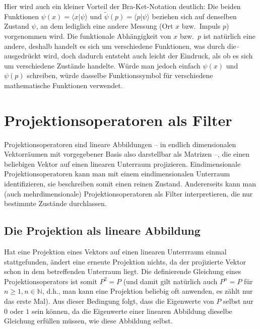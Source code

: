 Hier wird auch ein kleiner Vorteil der Bra-Ket-Notation deutlich: Die beiden Funktionen 
$\psi(x)=\langle x|\psi\rangle$ und $\tilde{\psi}(p)=\langle p|\psi\rangle$ beziehen sich auf
denselben Zustand $\psi$, an dem lediglich eine andere Messung (Ort $x$ bzw.\ Impuls $p$)
vorgenommen wird. Die funktionale Abh\"angigkeit von $x$ bzw.\ $p$ ist nat\"urlich eine
andere, deshalb handelt es sich um verschiedene Funktionen, was durch die $\tilde{~}$
ausgedr\"uckt wird, doch dadurch entsteht auch leicht der Eindruck, als ob es sich um 
verschiedene Zust\"ande handelte. W\"urde man jedoch einfach $\psi(x)$ und $\psi(p)$ schreiben,
w\"urde dasselbe Funktionssymbol f\"ur verschiedene mathematische Funktionen verwendet. 

\section{Projektionsoperatoren als \glqq Filter\grqq}

Projektionsoperatoren 
sind lineare Abbildungen -- in endlich dimensionalen Vektorr\"aumen
mit vorgegebener Basis also darstellbar als Matrizen --, die einen beliebigen Vektor auf einen
linearen Unterraum projizieren. Eindimensionale Projektionsoperatoren kann man mit einem
eindimensionalen Unterraum identifizieren, sie beschreiben somit einen reinen Zustand. Andererseits
kann man (auch mehrdimensionale) Projektionsoperatoren als Filter interpretieren, die nur
bestimmte Zust\"ande durchlassen. 

\subsection{Die Projektion als lineare Abbildung}

Hat eine Projektion eines Vektors auf einen linearen Unterrraum einmal stattgefunden, \"andert
eine erneute Projektion nichts, da der projizierte Vektor schon in dem betreffenden Unterraum
liegt. Die definierende Gleichung eines Projektionsoperators ist somit $P^2=P$ (und
damit gilt nat\"urlich auch $P^n=P$ f\"ur $n\geq 1, n\in \mathbb{N}$, d.h., man kann eine Projektion
beliebig oft anwenden, es z\"ahlt nur das erste Mal). Aus dieser Bedingung folgt, dass die
Eigenwerte von $P$ selbst nur $0$ oder $1$ sein k\"onnen, da die Eigenwerte einer linearen
Abbildung dieselbe Gleichung erf\"ullen m\"ussen, wie diese Abbildung selbst.


